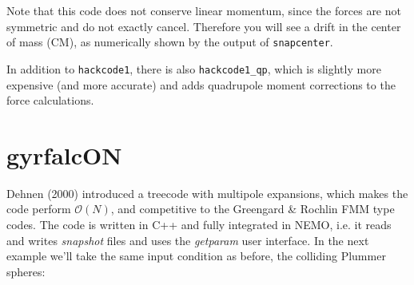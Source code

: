 Note that this code does not conserve linear momentum, since the
forces are not symmetric and do not exactly cancel. Therefore
you will see a drift in the center of mass (CM), as numerically
shown by the output of {\tt snapcenter}.

In addition to {\tt hackcode1}, there is also
{\tt hackcode1\_qp}, which is slightly more expensive (and more accurate) and adds
quadrupole moment corrections to the force calculations. 

\section{gyrfalcON}

Dehnen (2000) introduced a treecode with multipole expansions, which makes
the code perform $\mathcal{O}(N)$, and competitive to the
Greengard \& Rochlin FMM type codes. The code is written in C++ and fully integrated
in NEMO, i.e. it reads and writes {\it snapshot} files and uses the
{\it getparam} user interface. In the next example we'll take the same input condition
as before, the colliding Plummer spheres:


